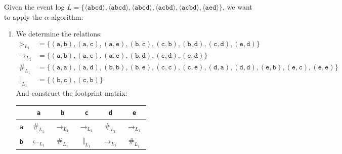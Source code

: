 \begin{description}
        \begin{example}
            Given the event log $L = \{ \langle \texttt{abcd} \rangle, \langle \texttt{abcd} \rangle, 
            \langle \texttt{abcd} \rangle, \langle \texttt{acbd} \rangle, \langle \texttt{acbd} \rangle, \langle \texttt{aed} \rangle \}$,
            we want to apply the $\alpha$-algorithm:
            \begin{enumerate}
                \item We determine the relations:
                    \[ 
                        \begin{split}
                            >_{L_1} &= \{ (\texttt{a}, \texttt{b}), (\texttt{a}, \texttt{c}), (\texttt{a}, \texttt{e}), (\texttt{b}, \texttt{c}),
                                    (\texttt{c}, \texttt{b}), (\texttt{b}, \texttt{d}), (\texttt{c}, \texttt{d}), (\texttt{e}, \texttt{d}) \} \\
                            \rightarrow_{L_1} &= \{ (\texttt{a}, \texttt{b}), (\texttt{a}, \texttt{c}), (\texttt{a}, \texttt{e}), 
                                                (\texttt{b}, \texttt{d}), (\texttt{c}, \texttt{d}), (\texttt{e}, \texttt{d}) \} \\
                            \#_{L_1} &= \{ (\texttt{a}, \texttt{a}), (\texttt{a}, \texttt{d}), (\texttt{b}, \texttt{b}), (\texttt{b}, \texttt{e}), (\texttt{c}, \texttt{c}), 
                                (\texttt{c}, \texttt{e}), (\texttt{d}, \texttt{a}), (\texttt{d}, \texttt{d}), (\texttt{e}, \texttt{b}), (\texttt{e}, \texttt{c}), (\texttt{e}, \texttt{e}) \} \\
                            \Vert_{L_1} &= \{ (\texttt{b}, \texttt{c}), (\texttt{c}, \texttt{b}) \} 
                        \end{split} 
                    \]
                    And construct the footprint matrix:
                    \begin{center}
                        \begin{tabular}{c | c c c c c}
                                        & \texttt{a}            & \texttt{b}            & \texttt{c}            & \texttt{d}            & \texttt{e} \\
                            \hline
                            \texttt{a}  & $\#_{L_1}$            & $\rightarrow_{L_1}$   & $\rightarrow_{L_1}$   & $\#_{L_1}$            & $\rightarrow_{L_1}$ \\
                            \texttt{b}  & $\leftarrow_{L_1}$    & $\#_{L_1}$            & $\Vert_{L_1}$         & $\rightarrow_{L_1}$   & $\#_{L_1}$ \\

\end{tabular}
\end{center}
\end{enumerate}
\end{example}
\end{description}
